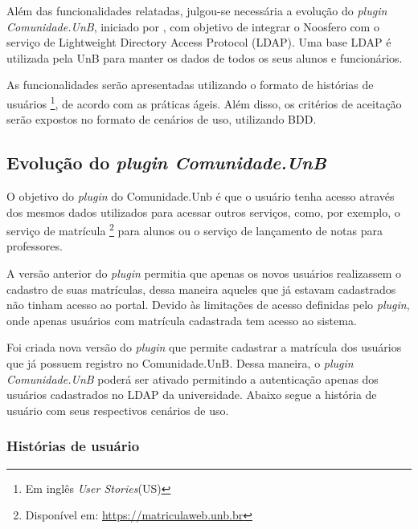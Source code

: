 Além das funcionalidades relatadas, julgou-se necessária a evolução do \textit{plugin Comunidade.UnB}, iniciado por , com objetivo de integrar o Noosfero com o serviço de Lightweight Directory Access Protocol (LDAP). Uma base LDAP é utilizada pela UnB para manter os dados de todos os seus alunos e funcionários.

As funcionalidades serão apresentadas utilizando o formato de histórias de usuários \footnote{Em inglês \textit{User Stories}(US)}, de acordo com as práticas ágeis. Além disso, os critérios de aceitação serão expostos no formato de cenários de uso, utilizando BDD.

\subsection{Evolução do \textit{plugin Comunidade.UnB}}
\label{plugin-comunidade}

O objetivo do \textit{plugin} do Comunidade.Unb é que o usuário tenha acesso através dos mesmos dados utilizados para acessar outros serviços, como, por exemplo, o serviço de matrícula \footnote{Disponível em: \url{https://matriculaweb.unb.br}} para alunos ou o serviço de lançamento de notas para professores.

A versão anterior do \textit{plugin} permitia que apenas os novos usuários realizassem o cadastro de suas matrículas, dessa maneira aqueles que já estavam cadastrados não tinham acesso ao portal. Devido às limitações de acesso definidas pelo \textit{plugin}, onde apenas usuários com matrícula cadastrada tem acesso ao sistema.

Foi criada nova versão do \textit{plugin} que permite cadastrar a matrícula dos usuários que já possuem registro no Comunidade.UnB. Dessa maneira, o \textit{plugin Comunidade.UnB} poderá ser ativado permitindo a autenticação apenas dos usuários cadastrados no LDAP da universidade. Abaixo segue a história de usuário com seus respectivos cenários de uso.

\subsubsection*{Histórias de usuário}

